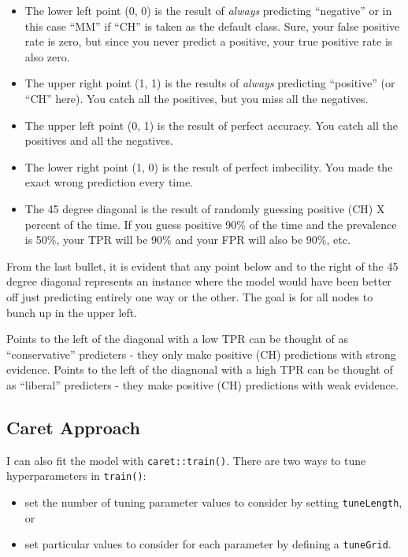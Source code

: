 \documentclass[
]{book}
\providecommand{\tightlist}{%
  \setlength{\itemsep}{0pt}\setlength{\parskip}{0pt}}
\begin{document}
\begin{itemize}
\tightlist
\item
  The lower left point (0, 0) is the result of \emph{always} predicting ``negative'' or in this case ``MM'' if ``CH'' is taken as the default class. Sure, your false positive rate is zero, but since you never predict a positive, your true positive rate is also zero.\\
\item
  The upper right point (1, 1) is the results of \emph{always} predicting ``positive'' (or ``CH'' here). You catch all the positives, but you miss all the negatives.
\item
  The upper left point (0, 1) is the result of perfect accuracy. You catch all the positives and all the negatives.
\item
  The lower right point (1, 0) is the result of perfect imbecility. You made the exact wrong prediction every time.
\item
  The 45 degree diagonal is the result of randomly guessing positive (CH) X percent of the time. If you guess positive 90\% of the time and the prevalence is 50\%, your TPR will be 90\% and your FPR will also be 90\%, etc.
\end{itemize}

From the last bullet, it is evident that any point below and to the right of the 45 degree diagonal represents an instance where the model would have been better off just predicting entirely one way or the other. The goal is for all nodes to bunch up in the upper left.

Points to the left of the diagonal with a low TPR can be thought of as ``conservative'' predicters - they only make positive (CH) predictions with strong evidence. Points to the left of the diagnonal with a high TPR can be thought of as ``liberal'' predicters - they make positive (CH) predictions with weak evidence.

\hypertarget{caret-approach}{%
\subsection{Caret Approach}\label{caret-approach}}

I can also fit the model with \texttt{caret::train()}. There are two ways to tune hyperparameters in \texttt{train()}:

\begin{itemize}
\tightlist
\item
  set the number of tuning parameter values to consider by setting \texttt{tuneLength}, or
\item
  set particular values to consider for each parameter by defining a \texttt{tuneGrid}.
\end{itemize}
\end{document}
